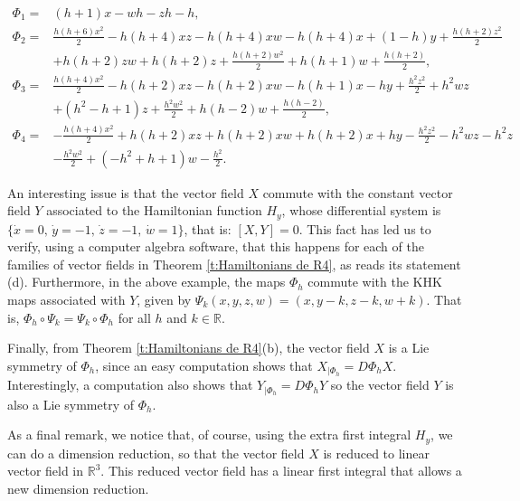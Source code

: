 \documentclass[11pt]{article}
\begin{document}
\begin{align*}
\Phi_1=&\left(h +1\right) x -w h -z h -h,\\
\Phi_2=&\frac{h \left(h +6\right) x^{2}}{2}-h \left(h +4\right) x z -h \left(h +4\right) x w -h \left(h +4\right) x +\left(1-h \right) y +\frac{h \left(h +2\right) z^{2}}{2}\\
&+h \left(h +2\right) z w +h \left(h +2\right) z +\frac{h \left(h +2\right) w^{2}}{2}+h \left(h +1\right) w +\frac{h \left(h +2\right)}{2},
\\
\Phi_3=&\frac{h \left(h +4\right) x^{2}}{2}-h \left(h +2\right) x z -h \left(h +2\right) x w -h \left(h +1\right) x -h y +\frac{h^{2} z^{2}}{2}+h^{2} w z \\
&+\left(h^{2}-h +1\right) z +\frac{h^{2} w^{2}}{2}+h \left(h -2\right) w +\frac{h \left(h -2\right)}{2},
\\
\Phi_4=&-\frac{h \left(h +4\right) x^{2}}{2}+h \left(h +2\right) x z +h \left(h +2\right) x w +h \left(h +2\right) x +h y -\frac{h^{2} z^{2}}{2}-h^{2} w z -h^{2} z\\
& -\frac{h^{2} w^{2}}{2}+\left(-h^{2}+h +1\right) w -\frac{h^{2}}{2}.
\end{align*}



An interesting issue is that the vector field $X$ commute with the constant vector field $Y$ associated to the Hamiltonian function $H_{y}$, whose differential system is $\{
\dot{x}=0,\,\dot{y}=-1,\,\dot{z}=-1,\,\dot{w}=1
\}$, that is: $[X,Y]=0$. This fact has led us to verify, using a computer algebra software, that this happens for each of the families of vector fields in Theorem \ref{t:Hamiltonians de R4}, as reads its statement (d). Furthermore, in the above example, the maps $\Phi_h$  commute with the KHK maps associated with $Y$, given by $\Psi_k(x,y,z,w)=(x,y-k,z-k,w+k)$. That is,  $\Phi_h\circ \Psi_k= \Psi_k\circ\Phi_h$ for all $h$ and $k\in\mathbb{R}$.

Finally, from Theorem \ref{t:Hamiltonians de R4}(b), the vector field $X$ is a Lie symmetry of $\Phi_{h}$, since an easy computation shows that $X_{|\Phi_{h}}=D\Phi_{h}X$. Interestingly, a computation also shows that $Y_{|\Phi_{h}}=D\Phi_{h}Y$ so the vector field $Y$ is also a Lie symmetry of $\Phi_{h}$.




As a final remark, we notice that, of course, using the extra first integral $H_{y}$, we can do a dimension reduction, so that the vector field $X$ is reduced to linear vector field in $\mathbb{R}^3$. This reduced vector field has a linear first integral that allows a new dimension reduction.
\end{document}
